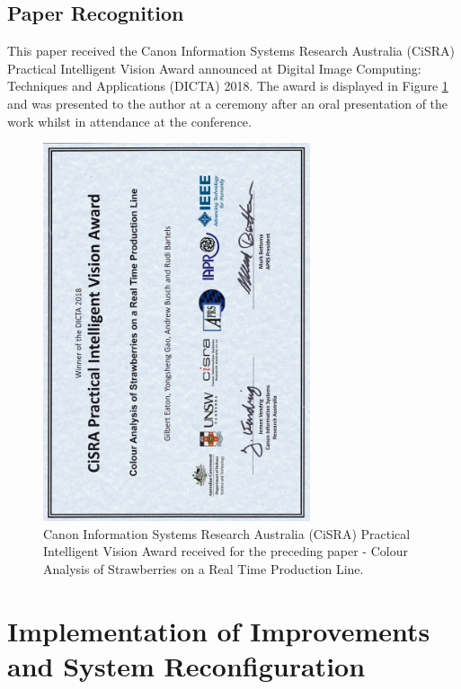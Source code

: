 \documentclass[fleqn,twoside,12pt]{report}
\begin{document}
\newpage

\section{Paper Recognition}

This paper received the Canon Information Systems Research Australia (CiSRA) Practical Intelligent Vision Award announced at Digital Image Computing: Techniques and Applications (DICTA) 2018. The award is displayed in Figure \ref{fig:CiSRA} and was presented to the author at a ceremony after an oral presentation of the work whilst in attendance at the conference.   


\begin{figure}[h]
	\centering
	\includegraphics[width=0.7\textwidth,angle=270]{CiSRA.pdf}
	\caption{Canon Information Systems Research Australia (CiSRA) Practical Intelligent Vision Award received for the preceding paper - Colour Analysis of Strawberries on a Real Time Production Line.}
	\label{fig:CiSRA}
\end{figure}




\newpage

\chapter{Implementation of Improvements and System Reconfiguration}
\label{sec:III}
\end{document}

